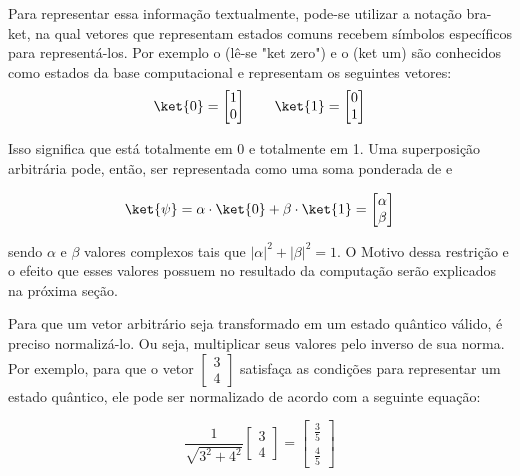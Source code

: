 Para representar essa informação textualmente, pode-se utilizar a notação bra-ket, na qual vetores que representam estados comuns recebem símbolos específicos para representá-los. Por exemplo o  (lê-se "ket zero") e o  (ket um) são conhecidos como estados da base computacional e representam os seguintes vetores:
\begin{equation}
  \ket{0} = \begin{bmatrix}
    1 \\
    0
  \end{bmatrix}
  \qquad
  \ket{1} = \begin{bmatrix}
    0 \\
    1
  \end{bmatrix}
\end{equation}

Isso significa que  está totalmente em 0 e  totalmente em 1. Uma superposição arbitrária \ket{\psi} pode, então, ser representada como uma soma ponderada de  e 

\begin{equation}
  \ket{\psi}
  =
  \alpha  \cdot  \ket{0} + \beta  \cdot  \ket{1}
  =
  \begin{bmatrix}
    \alpha \\
    \beta
  \end{bmatrix}
\end{equation}

\noindent
sendo $\alpha$ e $\beta$ valores complexos tais que $|\alpha|^2 + |\beta|^2 = 1$. O Motivo dessa restrição e o efeito que esses valores possuem no resultado da computação serão explicados na próxima seção.

Para que um vetor arbitrário seja transformado em um estado quântico válido, é preciso normalizá-lo. Ou seja, multiplicar seus valores pelo inverso de sua norma. Por exemplo, para que o vetor $\begin{bmatrix}3\\ 4\end{bmatrix}$ satisfaça as condições para representar um estado quântico, ele pode ser normalizado de acordo com a seguinte equação:

\begin{equation}[H]
  \label{eq:statenormalization}
  \frac{1}{\sqrt{3^2+4^2}}
  \begin{bmatrix}
    3\\
    4
  \end{bmatrix}
  =
  \begin{bmatrix}
    \frac{3}{5} \\
    \frac{4}{5}
  \end{bmatrix}
\end{equation}

